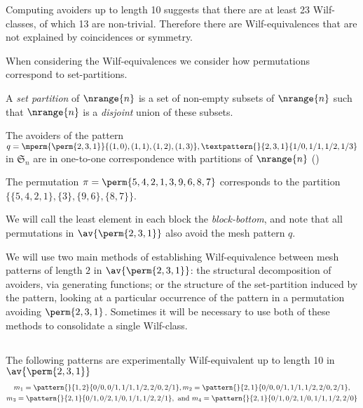 Computing avoiders up to length 10 suggests that there are at least 23 Wilf-classes,
of which 13 are non-trivial. Therefore there are Wilf-equivalences that are not
explained by coincidences or symmetry.

When considering the Wilf-equivalences we consider how permutations correspond
to set-partitions.

\begin{definition} A \emph{set partition} of \(\nrange{n}\) is a set of non-empty subsets of \(\nrange{n}\)
such that \(\nrange{n}\) is a \emph{disjoint} union of these subsets.
\end{definition}

\begin{note}
  The avoiders of the pattern \(q = \mperm{\perm{2,3,1}}{(1,0),(1,1),(1,2),(1,3)},
\textpattern{}{2,3,1}{1/0,1/1,1/2,1/3}\) in \(\mathfrak{S}_n\) are in one-to-one correspondence with partitions
of \(\nrange{n}\) (\textcite[Prop.~2]{DBLP:journals/ejc/Claesson01})
\end{note}
\begin{example}
    The permutation \(\pi = \perm{5,4,2,1,3,9,6,8,7}\) corresponds to the
    partition \(\{\{5,4,2,1\},\{3\},\{9,6\},\{8,7\}\}\).
\end{example}

We will call the least element in each block the \emph{block-bottom}, and note that all permutations
in \(\av{\perm{2,3,1}}\) also avoid the mesh pattern \(q\).

We will use two main methods of establishing Wilf-equivalence between mesh patterns of length \(2\)
in \(\av{\perm{2,3,1}}\): the structural decomposition of avoiders, via generating functions; or the
structure of the set-partition induced by the pattern, looking at a particular occurrence of the
pattern in a permutation avoiding \(\perm{2,3,1}\). Sometimes it will be necessary to use both of
these methods to consolidate a single Wilf-class.

\subsection{}
\nextvar
The following patterns are experimentally Wilf-equivalent up to length 10 in
\(\av{\perm{2,3,1}}\)
\begin{gather}
    m_1 = \pattern{}{1,2}{0/0,0/1,1/1,1/2,2/0,2/1},
    m_2 = \pattern{}{2,1}{0/0,0/1,1/1,1/2,2/0,2/1}, \label{eq:singleud}\\
    m_3 = \pattern{}{2,1}{0/1,0/2,1/0,1/1,1/2,2/1}, \text{ and }
    m_4 = \pattern{}{2,1}{0/1,0/2,1/0,1/1,1/2,2/0} \label{eq:other}
\end{gather}

